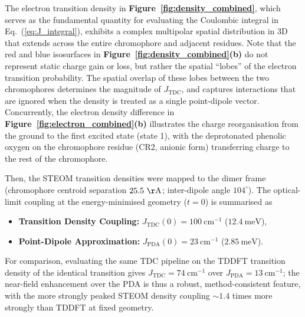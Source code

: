\documentclass[journal=jpcbfk, manuscript=article, layout=twocolumn, doi=true]{achemso}
\begin{document}
The electron transition density in \textbf{Figure~\ref{fig:density_combined}}, which serves as the fundamental quantity for evaluating the Coulombic integral in Eq.~(\ref{eq:J_integral}), exhibits a complex multipolar spatial distribution in 3D that extends across the entire chromophore and adjacent residues. Note that the red and blue isosurfaces in \textbf{Figure~\ref{fig:density_combined}(b)} do not represent static charge gain or loss, but rather the spatial ``lobes'' of the electron transition probability. The spatial overlap of these lobes between the two chromophores determines the magnitude of $J_{\text{TDC}}$, and captures interactions that are ignored when the density is treated as a single point-dipole vector. Concurrently, the electron density difference in \textbf{Figure~\ref{fig:electron_combined}(b)} illustrates the charge reorganisation from the ground to the first excited state (state 1), with the deprotonated phenolic oxygen on the chromophore residue (CR2, anionic form) transferring charge to the rest of the chromophore. 

Then, the STEOM transition densities were mapped to the dimer frame (chromophore centroid separation $25.5~\mathrm{\AA}$; inter-dipole angle $104^{\circ}$). The optical-limit coupling at the energy-minimised geometry ($t=0$) is summarised as

{\sloppy\setlength{\leftmargini}{1em}
\begin{itemize}
    \item \textbf{Transition Density Coupling:} $J_{\text{TDC}}(0) = 100~\mathrm{cm^{-1}}$ ($12.4~\mathrm{meV}$),
    \item \textbf{Point-Dipole Approximation:} $J_{\text{PDA}}(0) = 23~\mathrm{cm^{-1}}$ ($2.85~\mathrm{meV}$).
\end{itemize}}

\noindent For comparison, evaluating the same TDC pipeline on the TDDFT transition density of the identical transition gives $J_{\text{TDC}} = 74~\mathrm{cm^{-1}}$ over $J_{\text{PDA}} = 13~\mathrm{cm^{-1}}$; the near-field enhancement over the PDA is thus a robust, method-consistent feature, with the more strongly peaked STEOM density coupling ${\sim}1.4$ times more strongly than TDDFT at fixed geometry.
\end{document}
